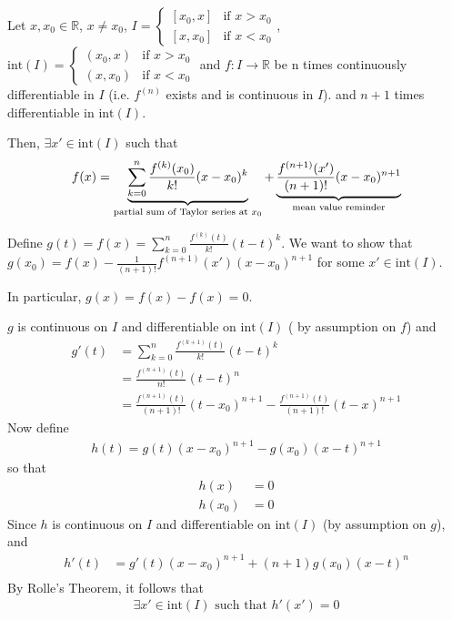 \documentclass{tufte-handout}
\begin{document}
\begin{Theorem}
    Let \( x, x_0 \in \mathbb{R} \), \( x \neq x_0 \), 
    \(I = \begin{cases}
        [x_0, x] & \text{if } x > x_0\\
        [x, x_0] & \text{if } x < x_0
    \end{cases}\), 
    \( \text{int}(I) = \begin{cases}
        (x_0, x) & \text{if } x > x_0\\
        (x, x_0) & \text{if } x < x_0
    \end{cases} \) and \( f: I \to \mathbb{R} \) be 
    n times continuously differentiable in \( I \) (i.e. 
    \( f^{(n) } \) exists and is continuous in \( I \)).
    and \( n+1 \) times differentiable in \( \text{int}(I) \).
    
    Then, \(\exists x' \in \text{int}(I) \) such that
    \begin{align}
        f(x) = \underbrace{\sum_{k=0}^{n}\frac{f^{(k)}(x_0)}{k!}(x-x_0)^k}_{\text{partial sum of Taylor series at \( x_0 \)}} 
        + \underbrace{\frac{f^{(n+1)}(x')}{(n+1)!}(x-x_0)^{n+1}}_{\text{mean value reminder}}
    \end{align}
\end{Theorem}
Define \(g(t) = f(x) = \sum_{k=0}^{n}\frac{f^{(k)}(t)}{k!}(t-t)^k \).
We want to show that 
\(g(x_0) = f(x) - \frac{1}{(n+1)!}f^{(n+1)}(x')(x-x_0)^{n+1}\) for some 
\( x' \in \text{int}(I) \).

In particular, \( g(x) = f(x) - f(x) = 0 \).

\( g \) is continuous on \( I \) and differentiable on \( \text{int}(I) \) (
    by assumption on \( f \)) and 
\begin{align}
    g'(t) &= \sum_{k=0}^{n}\frac{f^{(k+1)}(t)}{k!}(t-t)^k \\
    &= \frac{f^{(n+1)}(t)}{n!}(t-t)^n \\
    &= \frac{f^{(n+1)}(t)}{(n+1)!}(t-x_0)^{n+1} - \frac{f^{(n+1)}(t)}{(n+1)!}(t-x)^{n+1}
\end{align}
Now define 
\begin{align}
    h(t) = g(t)(x-x_0)^{n+1} - g(x_0)(x-t)^{n+1}
\end{align}
so that 
\begin{align}
    h(x) &= 0\\
    h(x_0) &= 0
\end{align}
Since \( h \) is continuous on \( I \) and differentiable on \( \text{int}(I) \) 
(by assumption on \( g \)), and 
\begin{align}
 h'(t) &= g'(t)(x-x_0)^{n+1}  + (n+1)g(x_0)(x-t)^n\\
\end{align}
By Rolle's Theorem, it follows that 
\begin{align}
    \exists x' \in \text{int}(I) \text{ such that } h'(x') = 0
\end{align}
\end{document}
